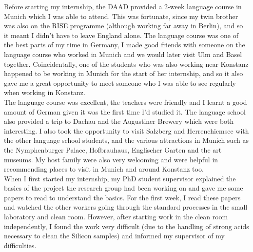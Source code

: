 \documentclass[final,a4paper,oneside,12pt]{article}
\begin{document}
Before starting my internship, the DAAD provided a 2-week language course in Munich which I was able to attend. This was fortunate, since my twin brother was also on the RISE programme (although working far away in Berlin), and so it meant I didn't have to leave England alone. The language course was one of the best parts of my time in Germany, I made good friends with someone on the language course who worked in Munich and we would later visit Ulm and Basel together. Coincidentally, one of the students who was also working near Konstanz happened to be working in Munich for the start of her internship, and so it also gave me a great opportunity to meet someone who I was able to see regularly when working in Konstanz.\\

The language course was excellent, the teachers were friendly and I learnt a good amount of German given it was the first time I'd studied it. The language school also provided a trip to Dachau and the Augustiner Brewery which were both interesting. I also took the opportunity to visit Salzberg and Herrenchiemsee with the other language school students, and the various attractions in Munich such as the Nymphenburger Palace, Hofbrauhaus, Englischer Garten and the art museums. My host family were also very welcoming and were helpful in recommending places to visit in Munich and around Konstanz too.\\

When I first started my internship, my PhD student supervisor explained the basics of the project the research group had been working on and gave me some papers to read to understand the basics. For the first week, I read these papers and watched the other workers going through the standard processes in the small laboratory and clean room. However, after starting work in the clean room independently, I found the work very difficult (due to the handling of strong acids necessary to clean the Silicon samples) and informed my supervisor of my difficulties.\\
\end{document}
